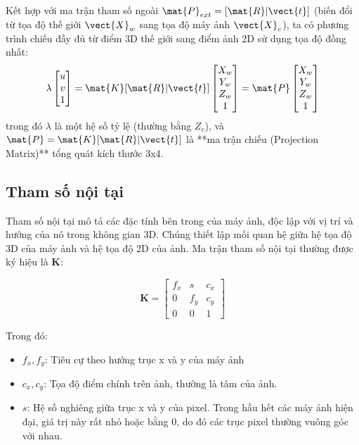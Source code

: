 Kết hợp với ma trận tham số ngoài $\mat{P}_{ext} = [\mat{R}|\vect{t}]$ (biến đổi từ tọa độ thế giới $\vect{X}_w$ sang tọa độ máy ảnh $\vect{X}_c$), ta có phương trình chiếu đầy đủ từ điểm 3D thế giới sang điểm ảnh 2D sử dụng tọa độ đồng nhất:
\begin{equation} \label{eq:full_projection}
\lambda \begin{bmatrix} u \\ v \\ 1 \end{bmatrix} 
= \mat{K} [\mat{R}|\vect{t}] 
\begin{bmatrix} X_w \\ Y_w \\ Z_w \\ 1 \end{bmatrix}
= \mat{P} \begin{bmatrix} X_w \\ Y_w \\ Z_w \\ 1 \end{bmatrix}
\end{equation}
trong đó $\lambda$ là một hệ số tỷ lệ (thường bằng $Z_c$), và $\mat{P} = \mat{K} [\mat{R}|\vect{t}]$ là **ma trận chiếu (Projection Matrix)** tổng quát kích thước 3x4.

\subsection{Tham số nội tại}

Tham số nội tại mô tả các đặc tính bên trong của máy ảnh, độc lập với vị trí và hướng của nó trong không gian 3D. Chúng thiết lập mối quan hệ giữa hệ tọa độ 3D của máy ảnh và hệ tọa độ 2D của ảnh. Ma trận tham số nội tại thường được ký hiệu là $\mathbf{K}$:

\begin{equation}
    \mathbf{K} = \begin{bmatrix}
    f_x & s & c_x \\
    0 & f_y & c_y \\
    0 & 0 & 1
    \end{bmatrix}
\end{equation}

Trong đó:
\begin{itemize}
\item {$f_x, f_y$}: Tiêu cự theo hướng trục x và y của máy ảnh
\item {$c_x, c_y$}: Tọa độ điểm chính trên ảnh, thường là tâm của ảnh.
\item {$s$}: Hệ số nghiêng giữa trục x và y của pixel. Trong hầu hết các máy ảnh hiện đại, giá trị này rất nhỏ hoặc bằng 0, do đó các trục pixel thường vuông góc với nhau.
\end{itemize} 

